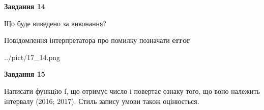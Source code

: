 \documentclass[11pt, ukrainian]{article}
\begin{document}
{\begin {large}
{\begin {center}\textbf{Завдання 14}\end {center}}\par
Що буде виведено за виконання? \par
Повідомлення інтерпретатора про помилку позначати \textbf{error}

\begin{center}
	{../pict/17_14.png}
\end{center}
\newpage

{\begin {center}\textbf{Завдання 15}\end {center}}\par

Написати функцiю f, що отримує число і повертає ознаку того, що воно належить iнтервалу (2016; 2017). Стиль запису умови також оцінюється.\par
\newpage

\end {large}}
\end{document}

